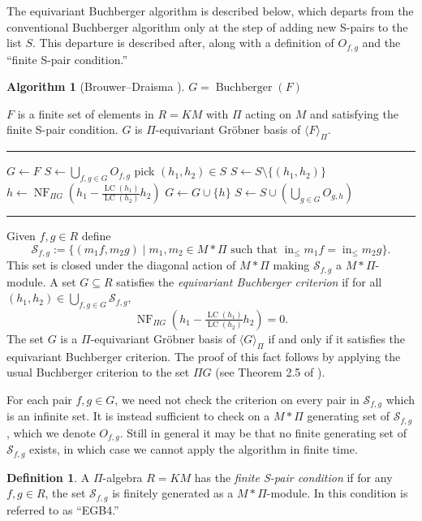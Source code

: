 \documentclass{amsart}
\theoremstyle{definition}
\newtheorem{definition}[theorem]{Definition}
\newtheorem{algorithm}[theorem]{Algorithm}
\theoremstyle{remark}
\numberwithin{equation}{section}
\newcommand{\C}[1]{\mathcal #1}
\newcommand{\alg}[1]{\operatorname{#1}}
\newcommand{\ideal}[1]{\langle #1 \rangle}
\DeclareMathOperator{\initial}{in}
\DeclareMathOperator{\NF}{NF}
\newcommand{\mon}{M}
\newcommand{\LT}{\initial_{\leq}}
\newcommand{\LC}{\operatorname{LC}}
\begin{document}
The equivariant Buchberger algorithm is described below, which departs from the conventional Buchberger algorithm only at the step of adding new S-pairs to the list $S$.  This departure is described after, along with a definition of $O_{f,g}$ and the ``finite S-pair condition.''

\begin{algorithm}[Brouwer--Draisma \cite{Brouwer09e}]\label{alg:Buchberger}
$G = \alg{Buchberger}(F)$
\begin{algorithmic}[1]
\REQUIRE $F$ is a finite set of elements in $R = K\mon$ with $\Pi$ acting on $\mon$ and satisfying the finite S-pair condition.
\ENSURE $G$ is $\Pi$-equivariant Gr\"obner basis of $\ideal{F}_{\Pi}$.

\smallskip \hrule \smallskip

\STATE $G\gets F$
\STATE $S\gets \bigcup_{f,g\in G} O_{f,g}$
	\STATE pick $(h_1,h_2) \in S$
	\STATE $S\gets S\setminus\{(h_1,h_2)\}$ 
	\STATE $h \gets \NF_{\Pi G}(h_1 - \frac{\LC(h_1)}{\LC(h_2)}h_2)$
		\STATE $G\gets G\cup \{h\}$
		\STATE $S\gets S\cup \left(\bigcup_{g\in G}O_{g,h}\right)$
	\ENDIF
\ENDWHILE
\smallskip \hrule \smallskip
\end{algorithmic}
\end{algorithm}

Given $f,g \in R$ define
 \[ \C S_{f,g} := \{(m_1f,m_2g) \mid m_1,m_2 \in \mon * \Pi \text{ such that } \LT m_1f = \LT m_2g\}. \]
This set is closed under the diagonal action of $\mon *\Pi$ making $\C S_{f,g}$ a $\mon *\Pi$-module.  A set $G \subseteq R$ satisfies the {\em equivariant Buchberger criterion} if for all $(h_1,h_2) \in \bigcup_{f,g\in G} \C S_{f,g}$,
 \[ \NF_{\Pi G}(h_1 - \tfrac{\LC(h_1)}{\LC(h_2)}h_2) = 0. \]
The set $G$ is a $\Pi$-equivariant Gr\"obner basis of $\ideal{G}_{\Pi}$ if and only if it satisfies the equivariant Buchberger criterion.  The proof of this fact follows by applying the usual Buchberger criterion to the set $\Pi G$ (see Theorem 2.5 of \cite{Brouwer09e}).

For each pair $f,g \in G$, we need not check the criterion on every pair in $\C S_{f,g}$ which is an infinite set.  It is instead sufficient to check on a $\mon * \Pi$ generating set of $\C S_{f,g}$, which we denote $O_{f,g}$.  Still in general it may be that no finite generating set of $\C S_{f,g}$ exists, in which case we cannot apply the algorithm in finite time.

\begin{definition}
 A $\Pi$-algebra $R = K\mon$ has the {\em finite S-pair condition} if for any $f,g \in R$, the set $\C S_{f,g}$ is finitely generated as a $\mon * \Pi$-module.  In \cite{Brouwer09e} this condition is referred to as ``EGB4.''
\end{definition}
\end{document}
